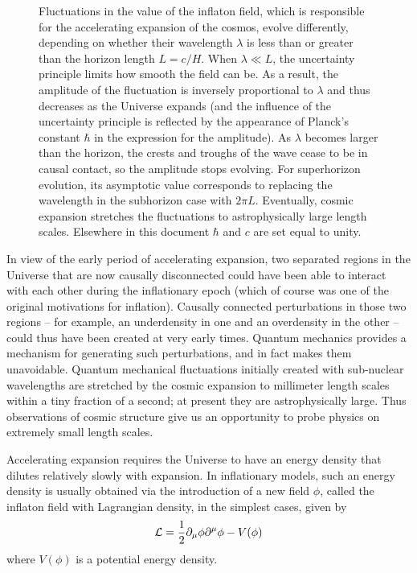 \begin{figure}[ht]
{Fluctuations in the value of the inflaton field, which is responsible for the accelerating expansion of the cosmos, evolve differently, depending on whether their wavelength $\lambda$ is less than or greater than the horizon length $L = c/H$. When $\lambda \ll L$, the uncertainty principle limits how smooth the field can be. As a result, the amplitude of the fluctuation is inversely proportional to $\lambda$ and thus decreases as the Universe expands (and the influence of the uncertainty principle is reflected by the appearance of Planck's constant $\hbar$ in the expression for the amplitude). As $\lambda$ becomes larger than the horizon, the crests and troughs of the wave cease to be in causal contact, so the amplitude stops evolving. For superhorizon evolution, its asymptotic value corresponds to replacing the wavelength in the subhorizon case with $2\pi L$. Eventually, cosmic expansion stretches the fluctuations to astrophysically large length scales. Elsewhere in this document $\hbar$ and $c$ are set equal to unity.
}
\label{fig:PTfigs}
\end{figure}


In view of the early period of accelerating expansion, two separated regions in the Universe that are now causally disconnected could have been able to interact with each other during the inflationary epoch (which of course was one of the original motivations for inflation). Causally connected perturbations in those two regions -- for example, an underdensity in one and an overdensity in the other -- could thus have been created at very early times. Quantum mechanics provides a mechanism for generating such perturbations, and in fact makes them unavoidable. Quantum mechanical fluctuations initially created with sub-nuclear wavelengths are stretched by the cosmic expansion to millimeter length scales within a tiny fraction of a second; at present they are astrophysically large. Thus observations of cosmic structure give us an opportunity to probe physics on extremely small length scales.

Accelerating expansion requires the Universe to have an energy density that dilutes relatively slowly with expansion. In inflationary models, such an energy density is usually obtained via the introduction of a new field $\phi$, called the inflaton field with Lagrangian density, in the simplest cases, given by
\begin{equation}
{\cal L} = \frac{1}{2} \partial_\mu \phi \partial^\mu \phi - V(\phi)
\end{equation}
where $V(\phi)$ is a potential energy density. 

